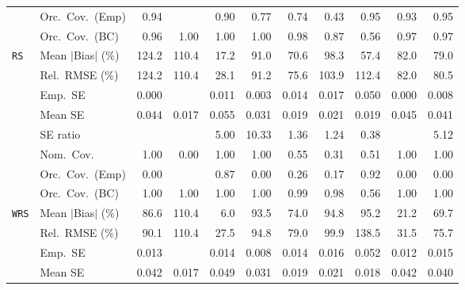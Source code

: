 \begin{landscape}
\begin{longtable}{llrrrrrrrrr}
 & Orc.\ Cov.\ (Emp) & \cellcolor{ranktwo}0.94 &  & 0.90 & 0.77 & 0.74 & 0.43 & \cellcolor{rankone}0.95 & \cellcolor{rankthree}0.93 & \cellcolor{rankone}0.95 \\
 & Orc.\ Cov.\ (BC) & \cellcolor{rankone}0.96 & 1.00 & 1.00 & 1.00 & \cellcolor{rankthree}0.98 & 0.87 & 0.56 & \cellcolor{ranktwo}0.97 & \cellcolor{ranktwo}0.97 \\
\addlinespace[2pt]
\quad \texttt{RS} & Mean $|$Bias$|$ (\%) & 124.2 & 110.4 & \cellcolor{rankone}17.2 & 91.0 & \cellcolor{rankthree}70.6 & 98.3 & \cellcolor{ranktwo}57.4 & 82.0 & 79.0 \\
 & Rel.\ RMSE (\%) & 124.2 & 110.4 & \cellcolor{rankone}28.1 & 91.2 & \cellcolor{ranktwo}75.6 & 103.9 & 112.4 & 82.0 & \cellcolor{rankthree}80.5 \\
 & Emp.\ SE & 0.000 &  & 0.011 & 0.003 & 0.014 & 0.017 & 0.050 & 0.000 & 0.008 \\
 & Mean SE & 0.044 & 0.017 & 0.055 & 0.031 & 0.019 & 0.021 & 0.019 & 0.045 & 0.041 \\
 & SE ratio &  &  & 5.00 & 10.33 & \cellcolor{ranktwo}1.36 & \cellcolor{rankone}1.24 & \cellcolor{rankthree}0.38 &  & 5.12 \\
 & Nom.\ Cov. & \cellcolor{rankone}1.00 & 0.00 & \cellcolor{rankone}1.00 & \cellcolor{rankone}1.00 & \cellcolor{ranktwo}0.55 & 0.31 & \cellcolor{rankthree}0.51 & \cellcolor{rankone}1.00 & \cellcolor{rankone}1.00 \\
 & Orc.\ Cov.\ (Emp) & 0.00 &  & \cellcolor{ranktwo}0.87 & 0.00 & \cellcolor{rankthree}0.26 & 0.17 & \cellcolor{rankone}0.92 & 0.00 & 0.00 \\
 & Orc.\ Cov.\ (BC) & \cellcolor{rankthree}1.00 & \cellcolor{rankthree}1.00 & \cellcolor{rankthree}1.00 & \cellcolor{rankthree}1.00 & \cellcolor{ranktwo}0.99 & \cellcolor{rankone}0.98 & 0.56 & \cellcolor{rankthree}1.00 & \cellcolor{rankthree}1.00 \\
\addlinespace[2pt]
\quad \texttt{WRS} & Mean $|$Bias$|$ (\%) & 86.6 & 110.4 & \cellcolor{rankone}6.0 & 93.5 & 74.0 & 94.8 & 95.2 & \cellcolor{ranktwo}21.2 & \cellcolor{rankthree}69.7 \\
 & Rel.\ RMSE (\%) & 90.1 & 110.4 & \cellcolor{rankone}27.5 & 94.8 & 79.0 & 99.9 & 138.5 & \cellcolor{ranktwo}31.5 & \cellcolor{rankthree}75.7 \\
 & Emp.\ SE & 0.013 &  & 0.014 & 0.008 & 0.014 & 0.016 & 0.052 & 0.012 & 0.015 \\
 & Mean SE & 0.042 & 0.017 & 0.049 & 0.031 & 0.019 & 0.021 & 0.018 & 0.042 & 0.040 \\

\end{longtable}
\end{landscape}

